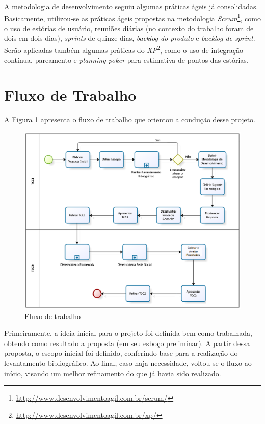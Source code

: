 A metodologia de desenvolvimento seguiu algumas práticas ágeis já consolidadas. Basicamente, utilizou-se as práticas ágeis propostas na metodologia \textit{Scrum}\footnote{\url{http://www.desenvolvimentoagil.com.br/scrum/}}, como o uso de estórias de usuário, reuniões diárias (no contexto do trabalho foram de dois em dois dias), \textit{sprints} de quinze dias, \textit{backlog do produto} e \textit{backlog de sprint}. Serão aplicadas também algumas práticas do \textit{XP}\footnote{\url{http://www.desenvolvimentoagil.com.br/xp/}}, como o uso de integração contínua, pareamento e \textit{planning poker} para estimativa de pontos das estórias.

\section{Fluxo de Trabalho}

A Figura \ref{processo tcc} apresenta o fluxo de trabalho que orientou a condução desse projeto.

\begin{figure}[h]
	\centering
	\includegraphics[scale=0.6]{figuras/capitulo4/processo_tcc.eps}
	\caption{Fluxo de trabalho}
	\label{processo tcc}
\end{figure}

Primeiramente, a ideia inicial para o projeto foi definida bem como trabalhada, obtendo como resultado a proposta (em seu esboço preliminar). A partir dessa proposta, o escopo inicial foi definido, conferindo base para a realização do levantamento bibliográfico. Ao final, caso haja necessidade, voltou-se o fluxo ao início, visando um melhor refinamento do que já havia sido realizado.

